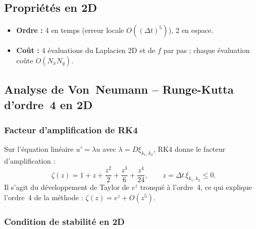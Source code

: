 \documentclass[11pt,a4paper]{report}
\begin{document}
    \subsection*{Propri\'et\'es en 2D}

\begin{itemize}[leftmargin=1.5em]
  \item \textbf{Ordre :} 4 en temps (erreur locale $O((\Delta t)^5)$), 2 en espace.
  
    
  \item \textbf{Co\^ut :} 4 \'evaluations du Laplacien 2D et de $f$ par pas ;
        chaque \'evaluation co\^ute $O(N_xN_y)$.
\end{itemize}


\subsection{Analyse de Von~Neumann -- Runge-Kutta d'ordre~4 en 2D}
\label{sec:vonneumann_RK4_2D}

\subsubsection*{Facteur d'amplification de RK4}

Sur l'\'equation lin\'eaire $u'=\lambda u$ avec $\lambda=D\xi_{k_1,k_2}$, RK4 donne le
facteur d'amplification :
\begin{equation}
  \zeta(z) = 1 + z + \frac{z^2}{2} + \frac{z^3}{6} + \frac{z^4}{24},
  \qquad z = \Delta t\,\xi_{k_1,k_2} \le 0.
\end{equation}
Il s'agit du d\'eveloppement de Taylor de $e^z$ tronqu\'e \`a l'ordre~4,
ce qui explique l'ordre~4 de la m\'ethode : $\zeta(z)=e^z+O(z^5)$.

\subsubsection*{Condition de stabilit\'e en 2D}
\end{document}
